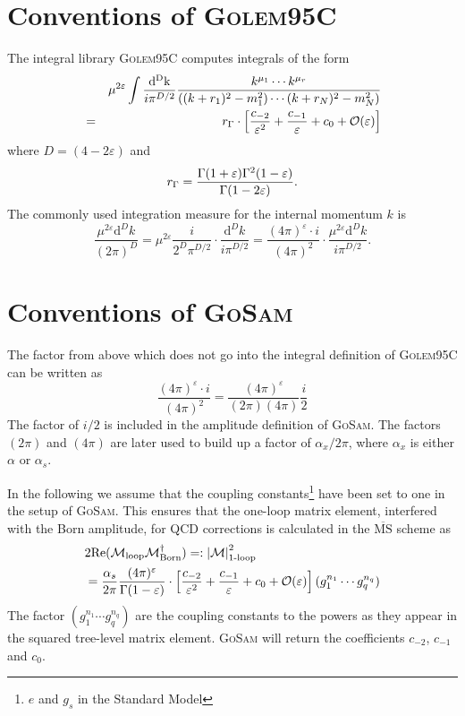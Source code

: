 \documentclass[11pt,a4paper]{refrep}
\newcommand{\gosamversion}{{3{.}0}}
\newcommand{\gosamv}[1][\gosamversion]{\textsc{GoSam}\xspace}
\newcommand{\golemVC}{\textsc{Golem95C}\xspace}
\newcommand{\diff}[1][{}]{{\mathrm{d}}^{#1}\!}
\newcommand{\nn}{\nonumber}
\begin{document}
\section{Conventions of \golemVC}
The integral library \golemVC{} computes integrals of the form
\begin{eqnarray}
&&\mu^{2\varepsilon}\int\frac{\mathrm{d^D k}}{i\pi^{D/2}}\frac{k^{\mu_1}\cdots k^{\mu_r}}{%
((k+r_1)^2-m_1^2)\cdots(k+r_N)^2-m_N^2)}\nn\\
&=&r_\Gamma\cdot\left[\frac{c_{-2}}{\varepsilon^2}+\frac{c_{-1}}{\varepsilon}+c_0
+{\mathcal{O}}(\varepsilon)\right]
\end{eqnarray}
where $D=(4-2\varepsilon)$ and
\begin{equation}
r_\Gamma=\frac{\Gamma(1+\varepsilon)\Gamma^2(1-\varepsilon)}{%
   \Gamma(1-2\varepsilon)}.
\end{equation}
The commonly used integration measure for the internal momentum $k$ is
\begin{equation}
\frac{\mu^{2\varepsilon}\diff[D]k}{(2\pi)^D}
=\mu^{2\varepsilon}\frac{i}{2^D\pi^{D/2}}\cdot\frac{{\mathrm d}^Dk}{i\pi^{D/2}}
=\frac{(4\pi)^\varepsilon \cdot i}{(4\pi)^2}\cdot%
 \frac{\mu^{2\varepsilon}{\mathrm d}^Dk}{i\pi^{D/2}}.
\end{equation}

\section{Conventions of \gosamv}
The factor from above which does not go into the integral definition of
\golemVC{} can be written as
\begin{equation}
\frac{(4\pi)^\varepsilon \cdot i}{(4\pi)^2}=
\frac{(4\pi)^\varepsilon}{(2\pi)(4\pi)}\frac{i}{2}
\end{equation}
The factor of $i/2$ is included in the amplitude definition of \gosamv{}.
The factors $(2\pi)$ and $(4\pi)$ are later used to build up a factor of
$\alpha_x/2\pi$, where $\alpha_x$ is either $\alpha$ or $\alpha_s$.

In the following we assume that the coupling constants\footnote{
$e$ and $g_s$ in the Standard Model} have been set to one in the
setup of \gosamv{}. This ensures that the one-loop matrix
element, interfered with the Born amplitude, for QCD corrections is calculated in the $\overline{\mathrm{MS}}$ scheme as
\begin{align}
&2{\mathrm{Re}}({\cal M}_{\mathrm{loop}}{\cal
                M}_{\mathrm{Born}}^\dagger)=:\left\vert\mathcal{M}\right\vert^2_{\text{1-loop}}\nonumber\\
  &=
\frac{\alpha_s}{2\pi}\frac{(4\pi)^\varepsilon}{\Gamma(1-\varepsilon)}
\cdot\left[\frac{c_{-2}}{\varepsilon^2}+\frac{c_{-1}}{\varepsilon}+c_0
+{\mathcal{O}}(\varepsilon)\right](g_1^{n_1}\cdots g_q^{n_q}) \label{eq:Conventions:nlo_matrix_element}
\end{align}
The factor $(g_1^{n_1}\cdots g_q^{n_q})$ are the coupling constants
to the powers as they appear in the squared tree-level matrix element. \gosamv{} will
return the coefficients $c_{-2}$, $c_{-1}$ and $c_0$.
\end{document}
